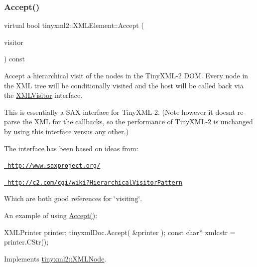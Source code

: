 \subsubsection{\texorpdfstring{Accept()}{Accept()}}
{\footnotesize\ttfamily virtual bool tinyxml2\+::\+X\+M\+L\+Element\+::\+Accept (\begin{DoxyParamCaption}\item[{\mbox{\hyperlink{classtinyxml2_1_1XMLVisitor}{X\+M\+L\+Visitor}} $\ast$}]{visitor }\end{DoxyParamCaption}) const\hspace{0.3cm}{\ttfamily [virtual]}}

Accept a hierarchical visit of the nodes in the Tiny\+X\+M\+L-\/2 D\+OM. Every node in the X\+ML tree will be conditionally visited and the host will be called back via the \mbox{\hyperlink{classtinyxml2_1_1XMLVisitor}{X\+M\+L\+Visitor}} interface.

This is essentially a S\+AX interface for Tiny\+X\+M\+L-\/2. (Note however it doesn\textquotesingle{}t re-\/parse the X\+ML for the callbacks, so the performance of Tiny\+X\+M\+L-\/2 is unchanged by using this interface versus any other.)

The interface has been based on ideas from\+:


\begin{DoxyItemize}
\item \href{http://www.saxproject.org/}{\texttt{ http\+://www.\+saxproject.\+org/}}
\item \href{http://c2.com/cgi/wiki?HierarchicalVisitorPattern}{\texttt{ http\+://c2.\+com/cgi/wiki?\+Hierarchical\+Visitor\+Pattern}}
\end{DoxyItemize}

Which are both good references for \char`\"{}visiting\char`\"{}.

An example of using \mbox{\hyperlink{classtinyxml2_1_1XMLElement_a3ea8a40e788fb9ad876c28a32932c6d5}{Accept()}}\+: \begin{DoxyVerb}XMLPrinter printer;
tinyxmlDoc.Accept( &printer );
const char* xmlcstr = printer.CStr();
\end{DoxyVerb}
 

Implements \mbox{\hyperlink{classtinyxml2_1_1XMLNode_a81e66df0a44c67a7af17f3b77a152785}{tinyxml2\+::\+X\+M\+L\+Node}}.

\mbox{\label{classtinyxml2_1_1XMLElement_a70e49ed60b11212ae35f7e354cfe1de9}} 
